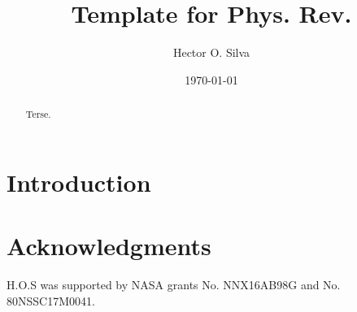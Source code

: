 \documentclass[aps, 10pt, prd,
               notitlepage, twocolumn, superscriptaddress,
               nofootinbib, floatfix]{revtex4-2}
\begin{document}
\title{Template for Phys. Rev.}

\begin{abstract}
Terse.
\end{abstract}

\author{Hector O. Silva}

\date{{\today}}

\maketitle

\section{Introduction}

\section*{Acknowledgments}
%
H.O.S was supported by NASA grants No. NNX16AB98G and No. 80NSSC17M0041.



\end{document}
